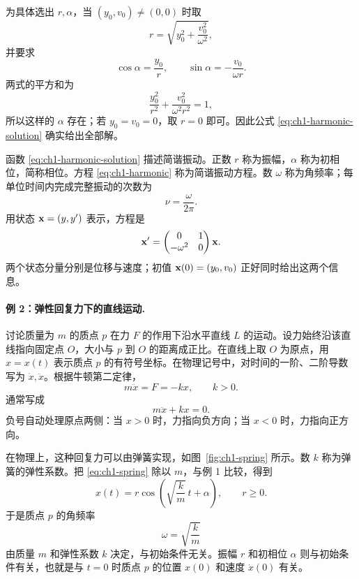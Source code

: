 为具体选出 \(r,\alpha\)，当 \((y_0,v_0)\neq(0,0)\) 时取
\[
 r=\sqrt{y_0^2+\frac{v_0^2}{\omega^2}},
\]
并要求
\[
 \cos\alpha=\frac{y_0}{r},
 \qquad
 \sin\alpha=-\frac{v_0}{\omega r}.
\]
两式的平方和为
\[
 \frac{y_0^2}{r^2}+\frac{v_0^2}{\omega^2r^2}=1,
\]
所以这样的 \(\alpha\) 存在；若 \(y_0=v_0=0\)，取 \(r=0\) 即可。因此公式 \eqref{eq:ch1-harmonic-solution} 确实给出全部解。

函数 \eqref{eq:ch1-harmonic-solution} 描述简谐振动。正数 \(r\) 称为振幅，\(\alpha\) 称为初相位，简称相位。方程 \eqref{eq:ch1-harmonic} 称为简谐振动方程。数 \(\omega\) 称为角频率；每单位时间内完成完整振动的次数为
\begin{equation}
 \nu=\frac{\omega}{2\pi}.
 \label{eq:ch1-frequency-harmonic}
\end{equation}
用状态 \(\vect{x}=(y,y')\) 表示，方程是
\[
 \vect{x}'=
 \begin{pmatrix}
  0&1\\
  -\omega^2&0
 \end{pmatrix}\vect{x}.
\]
两个状态分量分别是位移与速度；初值 \(\vect{x}(0)=(y_0,v_0)\) 正好同时给出这两个信息。

\paragraph{例 2：弹性回复力下的直线运动.}
讨论质量为 \(m\) 的质点 \(p\) 在力 \(F\) 的作用下沿水平直线 \(L\) 的运动。设力始终沿该直线指向固定点 \(O\)，大小与 \(p\) 到 \(O\) 的距离成正比。在直线上取 \(O\) 为原点，用 \(x=x(t)\) 表示质点 \(p\) 的有符号坐标。在物理记号中，对时间的一阶、二阶导数写为 \(\dot x,\ddot x\)。根据牛顿第二定律，
\begin{equation}
 m\ddot x=F=-kx,
 \qquad k>0.
 \label{eq:ch1-spring-newton}
\end{equation}
通常写成
\begin{equation}
 m\ddot x+kx=0.
 \label{eq:ch1-spring}
\end{equation}
负号自动处理原点两侧：当 \(x>0\) 时，力指向负方向；当 \(x<0\) 时，力指向正方向。

在物理上，这种回复力可以由弹簧实现，如图~\ref{fig:ch1-spring} 所示。数 \(k\) 称为弹簧的弹性系数。把 \eqref{eq:ch1-spring} 除以 \(m\)，与例 1 比较，得到
\begin{equation}
 x(t)=r\cos\left(\sqrt{\frac{k}{m}}\,t+\alpha\right),
 \qquad r\ge0.
 \label{eq:ch1-spring-solution}
\end{equation}
于是质点 \(p\) 的角频率
\[
 \omega=\sqrt{\frac{k}{m}}
\]
由质量 \(m\) 和弹性系数 \(k\) 决定，与初始条件无关。振幅 \(r\) 和初相位 \(\alpha\) 则与初始条件有关，也就是与 \(t=0\) 时质点 \(p\) 的位置 \(x(0)\) 和速度 \(\dot x(0)\) 有关。

